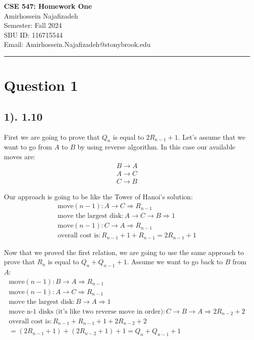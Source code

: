 \documentclass[12pt]{article}
\begin{document}
\begin{center}
    {\LARGE\textbf{CSE 547: Homework One}} \\[1em]
    {\large Amirhossein Najafizadeh} \\[1em]
    Semester: Fall 2024 \\ 
    SBU ID: 116715544 \\
    Email: Amirhossein.Najafizadeh@stonybrook.edu \\[1em]
    \noindent\rule{\textwidth}{0.6pt}
\end{center}

\section*{Question 1}
\subsection*{1). 1.10}
First we are going to prove that $Q_{n}$ is equal to $2R_{n-1}+1$. Let's assume that we want to go from $A$ to $B$ by using reverse algorithm. In this case our available moves are:
\begin{gather*}
    B \to A \\
    A \to C \\
    C \to B
\end{gather*}

Our approach is going to be like the Tower of Hanoi's solution:
\begin{gather*}
    \text{move} (n-1) : A \to C \Rightarrow R_{n-1} \\
    \text{move the largest disk} : A \to C \to B \Rightarrow 1 \\
    \text{move} (n-1) : C \to A \Rightarrow R_{n-1} \\
    \text{overall cost is} : R_{n-1} + 1 + R_{n-1} = 2R_{n-1} + 1
\end{gather*}

Now that we proved the first relation, we are going to use the same approach to prove that $R_{n}$ is equal to $Q_{n}+Q_{n-1}+1$. Assume we want to go back to $B$ from $A$:
\begin{gather*}
    \text{move} (n-1) : B \to A \Rightarrow R_{n-1} \\
    \text{move} (n-1) : A \to C \Rightarrow R_{n-1} \\
    \text{move the largest disk} : B \to A \Rightarrow 1 \\
    \text{move n-1 disks (it's like two reverse move in order)} : C \to B \to A \Rightarrow 2R_{n-2}+2 \\
    \text{overall cost is} : R_{n-1} + R_{n-1} + 1 + 2R_{n-2} + 2 \\= (2R_{n-1} + 1) + (2R_{n-2} + 1) + 1 = Q_{n} + Q_{n-1} + 1
\end{gather*}
\end{document}
